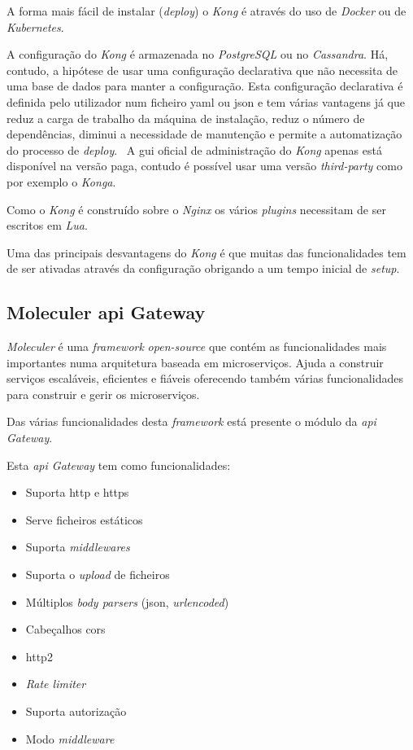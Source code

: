 A forma mais fácil de instalar (\textit{deploy}) o \textit{Kong} é através do uso de \textit{Docker} ou de \textit{Kubernetes}.

A configuração do \textit{Kong} é armazenada no \textit{PostgreSQL} ou no \textit{Cassandra}. Há, contudo, a hipótese de usar uma configuração declarativa que não necessita de uma base de dados para manter a configuração. Esta configuração declarativa é definida pelo utilizador num ficheiro \acrshort{yaml} ou \acrshort{json} e tem várias vantagens já que reduz a carga de trabalho da máquina de instalação, reduz o número de dependências, diminui a necessidade de manutenção e permite a automatização do processo de \textit{deploy}.~\cite{KongDBLess} A \acrshort{gui} oficial de administração do \textit{Kong} apenas está disponível na versão paga, contudo é possível usar uma versão \textit{third-party} como por exemplo o \textit{Konga}.

Como o \textit{Kong} é construído sobre o \textit{Nginx} os vários \textit{plugins} necessitam de ser escritos em \textit{Lua}.

Uma das principais desvantagens do \textit{Kong} é que muitas das funcionalidades tem de ser ativadas através da configuração obrigando a um tempo inicial de \textit{setup}.

\subsection{Moleculer \acrshort{api} Gateway}

\textit{Moleculer} é uma \textit{framework} \textit{open-source} que contém as funcionalidades mais importantes numa arquitetura baseada em microserviços. Ajuda a construir serviços escaláveis, eficientes e fiáveis oferecendo também várias funcionalidades para construir e gerir os microserviços.

Das várias funcionalidades desta \textit{framework} está presente o módulo da \textit{\acrshort{api} Gateway}.

Esta \textit{\acrshort{api} Gateway} tem como funcionalidades:~\cite{moleculerAPIG}
\begin{itemize}
    \item Suporta \acrshort{http} e \acrshort{https}
    \item Serve ficheiros estáticos
    \item Suporta \textit{middlewares}
    \item Suporta o \textit{upload} de ficheiros
    \item Múltiplos \textit{body parsers} (\acrshort{json}, \textit{urlencoded})
    \item Cabeçalhos \acrshort{cors}
    \item \acrshort{http}2
    \item \textit{Rate limiter}
    \item Suporta autorização
    \item Modo \textit{middleware}
\end{itemize}

